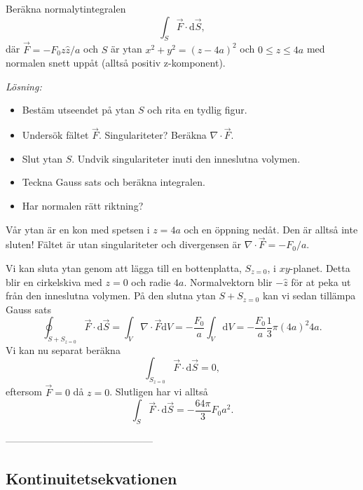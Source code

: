 \documentclass[%
oneside,                 %
final,                   %
10pt]{article}
\begin{document}
Beräkna normalytintegralen
\begin{equation}
\int_S \vec{F} \cdot \mbox{d}\vec{S},
\end{equation}
där $\vec{F} = -F_0 z \hat{z} / a$ och $S$ är ytan $x^2 + y^2 = (z-4a)^2$ och $0\le z \le 4a$ med normalen snett uppåt (alltså positiv z-komponent).

\emph{Lösning:} \\
\begin{itemize}
\item Bestäm utseendet på ytan $S$ och rita en tydlig figur.

\item Undersök fältet $\vec{F}$. Singulariteter? Beräkna $\nabla \cdot \vec{F}$.

\item Slut ytan $S$. Undvik singulariteter inuti den inneslutna volymen.

\item Teckna Gauss sats och beräkna integralen.

\item Har normalen rätt riktning?
\end{itemize}

\noindent
Vår ytan är en kon med spetsen i $z=4a$ och en öppning nedåt. Den är alltså inte sluten! Fältet är utan singulariteter och divergensen är $\nabla \cdot \vec{F} = -F_0 / a$.

Vi kan sluta ytan genom att lägga till en bottenplatta, $S_{z=0}$, i $xy$-planet. Detta blir en cirkelskiva med $z=0$ och radie $4a$. Normalvektorn blir $-\hat{z}$ för at peka ut från den inneslutna volymen. På den slutna ytan $S+S_{z=0}$ kan vi sedan tillämpa Gauss sats
\begin{equation}
  \oint_{S+S_{z=0}} \vec{F} \cdot \mbox{d}\vec{S} = \int_V \nabla \cdot \vec{F}
\mbox{d}V = -\frac{F_0}{a}\int_V\mbox{d}V = -\frac{F_0}{a} \frac{1}{3} \pi (4a)^2 4a.
\end{equation}
Vi kan nu separat beräkna
\begin{equation}
  \int_{S_{z=0}} \vec{F} \cdot \mbox{d}\vec{S} = 0,
\end{equation}
eftersom $\vec{F}=0$ då $z=0$.  Slutligen har vi alltså 
\begin{equation}
  \int_S \vec{F} \cdot \mbox{d}\vec{S} = -\frac{64\pi}{3} F_0 a^2.
\end{equation}

---------------------------------------------

\subsection{Kontinuitetsekvationen}
\end{document}
